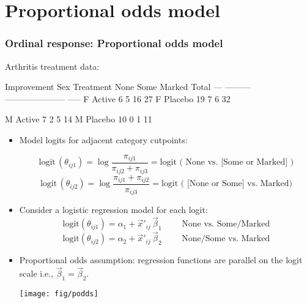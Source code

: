 \section{Proportional odds model}
\begin{frame}[fragile]
  \frametitle{Ordinal response: Proportional odds model}
Arthritis treatment data:
\begin{Output}[baselinestretch=.8]
                          Improvement
  Sex   Treatment    None    Some   Marked    Total
  ---   ---------    ---------------------    -----
   F     Active        6       5      16        27
   F     Placebo      19       7       6        32

   M     Active        7       2       5        14
   M     Placebo      10       0       1        11
\end{Output}
  \begin{itemize}
	\item Model logits for adjacent category cutpoints:

  \[
  \mbox{logit} \,  ( \theta_{ij1} )
 = \log  \frac{ \pi_{ij1} } { \pi_{ij2}  +  \pi_{ij3} }
 = \mbox{logit ( None vs. [Some or Marked] )}
  \]
  \[
  \mbox{logit} \,  ( \theta_{ij2} )
 = \log  \frac{ \pi_{ij1}  +  \pi_{ij2} } { \pi_{ij3} }
 = \mbox{logit ( [None or Some] vs. Marked)}
  \]
  \end{itemize}
% 
\end{frame}

\begin{frame}
  \begin{itemize}
	\item Consider a logistic regression model for each logit:
  \begin{equation*} 
  \mbox{logit} ( \theta_{ij1} )
 = \alpha _1  +  \vec{x} '_{ij} \,  \vec{\beta} _1 \quad\quad\mbox{  None vs. Some/Marked}
  \end{equation*}
  \begin{equation*} 
  \mbox{logit} ( \theta_{ij2} )
 = \alpha _2  +  \vec{x} '_{ij} \,  \vec{\beta} _2 \quad\quad\mbox{  None/Some vs. Marked}
  \end{equation*}

	\item Proportional odds assumption: 
	\alert{regression functions are parallel} on the logit scale
	i.e., \(\vec{\beta}_1 = \vec{\beta} _2\).

\begin{center}
  \texttt{[image: fig/podds]}
\end{center}
  \end{itemize}
\end{frame}

